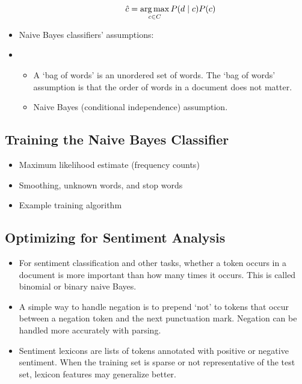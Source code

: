 \begin{itemize}
\begin{itemize}
                        \begin{equation}
                              \hat{c} = \operatorname*{arg\,max}_{c \in C} P(d \mid c) P(c)
                        \end{equation}
            \end{itemize}
      \item Naive Bayes classifiers' assumptions:
      \item[] \begin{itemize}
                  \item A `bag of words' is an unordered set of words.
                        The `bag of words' assumption is that the order of words in a document does not matter.
                  \item Naive Bayes (conditional independence) assumption.
            \end{itemize}
\end{itemize}

\subsection{Training the Naive Bayes Classifier}

\begin{itemize}
      \item Maximum likelihood estimate (frequency counts)
      \item Smoothing, unknown words, and stop words
      \item Example training algorithm
\end{itemize}

\setcounter{subsection}{3}
\subsection{Optimizing for Sentiment Analysis}

\begin{itemize}
      \item For sentiment classification and other tasks, whether a token occurs in a document is more important than how many times it occurs.
            This is called binomial or binary naive Bayes.
      \item A simple way to handle negation is to prepend `not' to tokens that occur between a negation token and the next punctuation mark.
            Negation can be handled more accurately with parsing.
      \item Sentiment lexicons are lists of tokens annotated with positive or negative sentiment.
            When the training set is sparse or not representative of the test set, lexicon features may generalize better.
\end{itemize}

